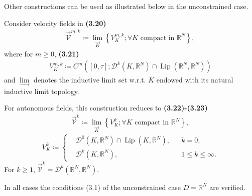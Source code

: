 \documentclass[oneside]{book}
\numberwithin{equation}{section}
\begin{document}
Other constructions can be used as illustrated below in the unconstrained case.

Consider velocity fields in \textbf{(3.20)}
\begin{align*}
    \vec{\mathcal{V}}^{m,k}\coloneqq\lim_{\vec{K}} \left\{V_K^{m,k};\forall K \mbox{ compact in } \mathbb{R}^N\right\},
\end{align*}
where for $m\ge 0$, \textbf{(3.21)}
\begin{align*}
    V_K^{m,k}\coloneqq C^m\left([0,\tau];\mathcal{D}^k(K,\mathbb{R}^N)\cap\operatorname{Lip}(\mathbb{R}^N,\mathbb{R}^N)\right)
\end{align*}
and $\lim\limits_\rightarrow$ denotes the inductive limit set w.r.t. $K$ endowed with its natural inductive limit topology.

For autonomous fields, this construction reduces to \textbf{(3.22)-(3.23)}
\begin{align*}
    \vec{\mathcal{V}}^k\coloneqq\lim_{\vec{K}} \left\{V_K^k;\forall K \mbox{ compact in } \mathbb{R}^N\right\},
\end{align*}
\begin{equation*}
    V_K^k\coloneqq\left\{\begin{split}
        &\mathcal{D}^0(K,\mathbb{R}^N)\cap\operatorname{Lip}(K,\mathbb{R}^N), && k = 0,\\
        &\mathcal{D}^k(K,\mathbb{R}^N), &&1\le k\le\infty.
    \end{split}\right.
\end{equation*}
For $k\ge 1$, $\vec{\mathcal{V}}^k = \mathcal{D}^k(\mathbb{R}^N,\mathbb{R}^N)$.

In all cases the conditions (3.1) of the unconstrained case $D = \mathbb{R}^N$ are verified.
\end{document}
